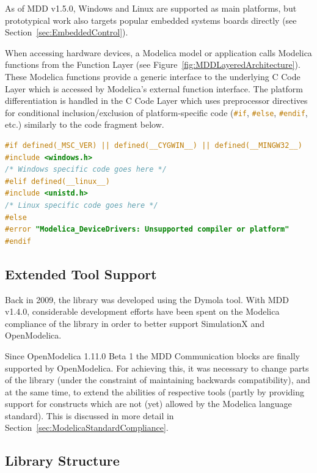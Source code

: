 \documentclass{resources/modelica}
\newcommand{\clang}[1]{\lstinline[language=c]|#1|}
\begin{document}
As of MDD v1.5.0, Windows and Linux are supported as main platforms,
but prototypical work also targets popular embedded systems boards directly (see
Section~\ref{sec:EmbeddedControl}).

When accessing hardware devices, a Modelica model or
application calls Modelica functions from the \textsf{Function Layer} (see
Figure~\ref{fig:MDDLayeredArchitecture}). These Modelica functions provide a
generic interface to the underlying \textsf{C Code Layer} which is accessed by
Modelica's external function interface.
The platform differentiation is handled in the \textsf{C Code Layer} which
uses preprocessor directives for conditional inclusion/exclusion of
platform-specific code (\mbox{\clang{#if}}, \mbox{\clang{#else}},
\mbox{\clang{#endif}}, etc.) similarly to the code fragment below.
\begin{lstlisting}[language=C]
#if defined(_MSC_VER) || defined(__CYGWIN__) || defined(__MINGW32__)
#include <windows.h>
/* Windows specific code goes here */
#elif defined(__linux__)
#include <unistd.h>
/* Linux specific code goes here */
#else
#error "Modelica_DeviceDrivers: Unsupported compiler or platform"
#endif
\end{lstlisting}

\subsection{Extended Tool Support}
\label{sec:ExtendedToolSupport}

Back in 2009, the library was developed using the Dymola tool. With MDD v1.4.0,
considerable development efforts have been spent on the Modelica compliance of
the library in order to better support SimulationX and OpenModelica.

Since OpenModelica 1.11.0 Beta 1 the MDD Communication blocks are finally
supported by OpenModelica. For achieving this, it was necessary to change parts
of the library (under the constraint of maintaining backwards compatibility),
and at the same time, to extend the abilities of respective tools (partly by
providing support for constructs which are not (yet) allowed by the Modelica
language standard). This is discussed in more detail in
Section~\ref{sec:ModelicaStandardCompliance}.

\subsection{Library Structure}
\label{sec:LibraryStructure}
\end{document}
